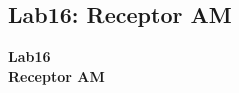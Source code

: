 \subsection{Lab16: Receptor AM}

\begin{frame}{}


\bfseries{\textrm{\LARGE Lab16\\ \Large Receptor AM}}
\raggedright
\end{frame}
